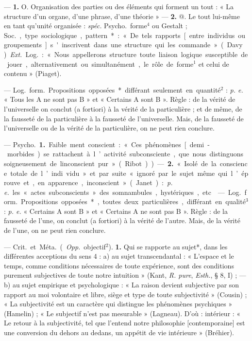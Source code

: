 \begin{itemize}[leftmargin=1cm, label=, itemsep=1pt]
 — {\bf 1.} O. Organisation des parties ou des éléments qui forment un
tout : « La structure d’un organe,
d'une phrase, d’une théorie » —
 {\bf 2.} @. Le tout lui-même en tant
qu'unité organisée : {\it spéc.} \si{Psycho.}
forme$^4$ ou Gestalt ; \si{Soc.}, type sociologique, pattern* : « De tels rapports
[entre individus ou groupements]
s'inscrivent dans une structure qui
les commande » (Davy). {\it Ext.} \si{Log.} :
« Nous appellerons structure toute
liaison logique susceptible de jouer,
alternativement ou simultanément,
le rôle de forme$^1$ et celui de contenu »
(Piaget).

 — \si{Log.} \si{form.} Propositions opposées* différant seulement en quantité$^2$ : {\it p. e.}
« Tous les A ne sont pas B » et « Certains A sont B ». Règle : de la vérité
de l’universelle on conclut (a fortiori) à la vérité de la particulière ;
et de même, de la fausseté de la
particulière à la fausseté de l’universelle. Mais, de la fausseté de
l’universelle ou de la vérité de la
particulière, on ne peut rien conclure.

 — \si{Psycho.} {\bf 1.} Faible
ment conscient : « Ces phénomènes
[demi-morbides) se rattachent à
l’activité subconsciente, que nous
distinguons soigneusement de linconscient pur » (Ribot)). — {\bf 2.} « Isolé
de la conscience totale de l’indi
vidu » et par suite « ignoré par le.
sujet même qui l’éprouve et, en
apparence, inconscient » (Janet) :
{\it p. e.} les « actes subconscients » des
somnambules, hystériques, etc.

 — \si{Log.} \si{form.} Propositions opposées*, toutes
deux particulières, différant en qualité$^3$ : {\it p. e.} « Certains A sont B » et
« Certains A ne sont pas B ». Règle :
de la fausseté de l’une, on conclut
(a fortiori) à la vérité de l’autre.
Mais, de la vérité de l’une, on ne
peut rien conclure.

 — \si{Crit.} et \si{Méta.} ({\it Opp.}
objectif$^2$). {\bf 1.} Qui se rapporte au
sujet*, dans les différentes acceptions du sens 4 : a) au sujet transcendantal : « L'espace et le temps,
comme conditions nécessaires de
toute expérience, sont des conditions purement subjectives de toute
notre intuition » (Kant, {\it R. pure},
{\it Esth.}, § 8, I) ; — b) au sujet empirique et psychologique : « La raison
devient subjective par son rapport
au moi volontaire et libre, siège et
type de toute subjectivité » (Cousin) ; « La subjectivité est un caractère qui distingue les phénomènes
psychiques » (Hamelin) ; « Le subjectif n’est pas mesurable » (Lagneau). D'où : intérieur : « Le retour
à la subjectivité, tel que l'entend
notre philosophie [contemporaine]
est une conversion du dehors au
dedans, un appétit de vie intérieure » (Bréhier).


\end{itemize}
